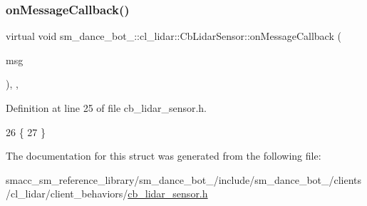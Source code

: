 \subsubsection{\texorpdfstring{on\+Message\+Callback()}{onMessageCallback()}}
{\footnotesize\ttfamily virtual void sm\+\_\+dance\+\_\+bot\+\_\+::cl\+\_\+lidar\+::\+Cb\+Lidar\+Sensor\+::on\+Message\+Callback (\begin{DoxyParamCaption}\item[{const sensor\+\_\+msgs\+::\+Laser\+Scan \&}]{msg }\end{DoxyParamCaption})\hspace{0.3cm}{\ttfamily [inline]}, {\ttfamily [override]}, {\ttfamily [virtual]}}



Definition at line 25 of file cb\+\_\+lidar\+\_\+sensor.\+h.


\begin{DoxyCode}
26   \{
27   \}
\end{DoxyCode}


The documentation for this struct was generated from the following file\+:\begin{DoxyCompactItemize}
\item 
smacc\+\_\+sm\+\_\+reference\+\_\+library/sm\+\_\+dance\+\_\+bot\+\_/include/sm\+\_\+dance\+\_\+bot\+\_/clients/cl\+\_\+lidar/client\+\_\+behaviors/\hyperlink{sm__dance__bot__2_2include_2sm__dance__bot__2_2clients_2cl__lidar_2client__behaviors_2cb__lidar__sensor_8h}{cb\+\_\+lidar\+\_\+sensor.\+h}\end{DoxyCompactItemize}
